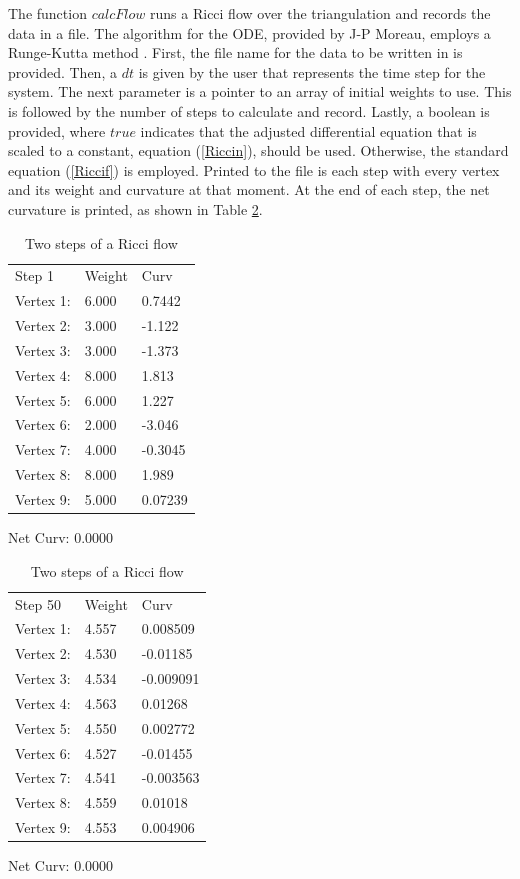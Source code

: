 \documentclass[12pt]{article}
\begin{document}
\noindent The function $calcFlow$ runs a Ricci flow over the triangulation and records the data in a file. The algorithm for the ODE, provided by J-P Moreau, employs a Runge-Kutta method \cite{JPM}. First, the file name for the data to be written in is provided. Then, a $dt$ is given by the user that represents the time step for the system. The next parameter is a pointer to an array of initial weights to use. This is followed by the number of steps to calculate and record. Lastly, a boolean is provided, where $true$ indicates that the adjusted differential equation that is scaled to a constant, equation (\ref{Riccin}), should be used. Otherwise, the standard equation (\ref{Riccif}) is employed. Printed to the file is each step with every vertex and its weight and curvature at that moment. At the end of each step, the net curvature is printed, as shown in Table \ref{tab:ricciSteps}.\newline
\begin{table}
\begin{center}
\begin{minipage}{2.2in}
\begin{tabular}{l|l|l}
\hline
Step 1   & Weight &  Curv\\
Vertex 1:& 6.000 & 0.7442\\
Vertex 2: &3.000 & -1.122\\
Vertex 3:& 3.000 & -1.373\\
Vertex 4:& 8.000 & 1.813\\
Vertex 5: &6.000 & 1.227\\
Vertex 6: &2.000 & -3.046\\
Vertex 7: &4.000 & -0.3045\\
Vertex 8: &8.000 & 1.989\\
Vertex 9: &5.000 & 0.07239\\ \hline
\end{tabular} 
Net Curv: 0.0000
\end{minipage}
\begin{minipage}{2.2in}
\begin{tabular}{l|l|l}
\hline
Step 50 &  Weight &  Curv\\
Vertex 1:& 4.557 & 0.008509\\
Vertex 2: &4.530 & -0.01185\\
Vertex 3: &4.534 & -0.009091\\
Vertex 4:& 4.563 & 0.01268\\
Vertex 5:& 4.550 & 0.002772\\
Vertex 6: &4.527 & -0.01455\\
Vertex 7: &4.541 & -0.003563\\
Vertex 8: &4.559 & 0.01018\\
Vertex 9: &4.553 & 0.004906\\ \hline
\end{tabular}
Net Curv: 0.0000
\end{minipage}
\end{center}
\caption{Two steps of a Ricci flow}
\label{tab:ricciSteps}
\end{table}
\end{document}
